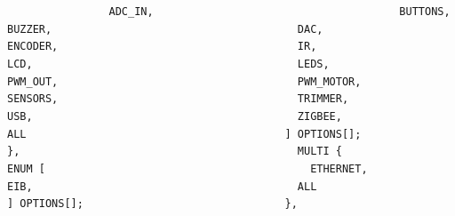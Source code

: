 {{{{{\lstinline!                ADC_IN,                      ! \newline
\lstinline!                BUTTONS,                     ! \newline
\lstinline!                BUZZER,                      ! \newline
\lstinline!                DAC,                         ! \newline
\lstinline!                ENCODER,                     ! \newline
\lstinline!                IR,                          ! \newline
\lstinline!                LCD,                         ! \newline
\lstinline!                LEDS,                        ! \newline
\lstinline!                PWM_OUT,                     ! \newline
\lstinline!                PWM_MOTOR,                   ! \newline
\lstinline!                SENSORS,                     ! \newline
\lstinline!                TRIMMER,                     ! \newline
\lstinline!                USB,                         ! \newline
\lstinline!                ZIGBEE,                      ! \newline
\newline					
\lstinline!                ALL                          ! \newline
\lstinline!              ] OPTIONS[];                   ! \newline
\lstinline!            },                               ! \newline
\lstinline!            MULTI {                          ! \newline
\lstinline!              ENUM [                         ! \newline
\lstinline!                ETHERNET,                    ! \newline
\lstinline!                EIB,                         ! \newline
\lstinline!                ALL                          ! \newline
\lstinline!              ] OPTIONS[];                   ! \newline
\lstinline!            },                               ! \newline
}}}}}
